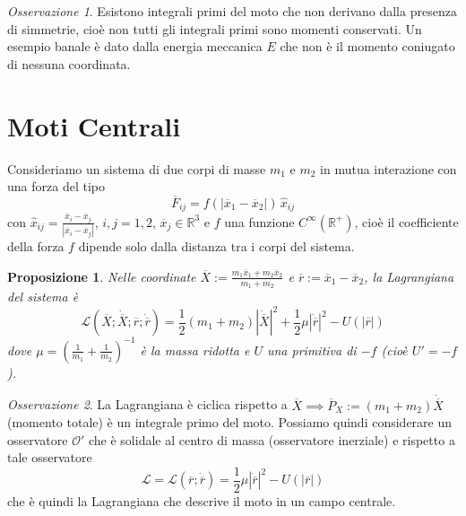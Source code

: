 \documentclass{book}
\theoremstyle{plain}
\theoremstyle{plain}
\theoremstyle{plain}
\theoremstyle{plain}
\theoremstyle{plain}
\newtheorem{prop}{Proposizione}[chapter]
\theoremstyle{definition}
\theoremstyle{remark}
\newtheorem*{oss}{Osservazione}
\theoremstyle{definition}
\begin{document}
\begin{oss}
    Esistono integrali primi del moto che non derivano dalla presenza di simmetrie, cioè non tutti gli integrali primi sono momenti conservati. Un esempio banale è dato dalla energia meccanica $E$ che non è il momento coniugato di nessuna coordinata.
\end{oss}

\section{Moti Centrali}

Consideriamo un sistema di due corpi di masse $m_1$ e $m_2$ in mutua interazione con una forza del tipo
\begin{displaymath}
    \overline{F}_{ij}=f(|\overline{x}_1-\overline{x}_2|)\,\hat{x}_{ij}
\end{displaymath}
con $\hat{x}_{ij}=\frac{\overline{x}_i-\overline{x}_j}{|\overline{x}_i-\overline{x}_j|}$, $i,j=1,2$, $\overline{x}_j\in\mathbb{R}^3$ e $f$ una funzione $C^\infty(\mathbb{R}^+)$, cioè il coefficiente della forza $f$ dipende solo dalla distanza tra i corpi del sistema.

\begin{prop}
\everymath{\displaystyle}
    Nelle coordinate $\overline{X}:=\frac{m_1\overline{x}_1+m_2\overline{x}_2}{m_1+m_2}$ e $\overline{r}:=\overline{x}_1-\overline{x}_2$, la Lagrangiana del sistema è
    \begin{displaymath}
        \mathcal{L}(\overline{X};\dot{\overline{X}};\overline{r};\dot{\overline{r}})=\frac{1}{2}(m_1+m_2)|\dot{\overline{X}}|^2+\frac{1}{2}\mu|\dot{\overline{r}}|^2 -U(|\overline{r}|)
    \end{displaymath}
    dove $\mu=(\frac{1}{m_1}+\frac{1}{m_2})^{-1}$ è la massa ridotta e $U$ una primitiva di $-f$ (cioè $U'=-f$).
\end{prop}

\begin{oss}
    La Lagrangiana è ciclica rispetto a $\overline{X} \implies \overline{P}_X:=(m_1+m_2)\dot{\overline{X}}$ (momento totale) è un integrale primo del moto. Possiamo quindi considerare un osservatore $\mathcal{O}'$ che è solidale al centro di massa (osservatore inerziale) e rispetto a tale osservatore
    \begin{displaymath}
    \boxed{
        \mathcal{L}=\mathcal{L}(\overline{r};\dot{\overline{r}})=\frac{1}{2}\mu|\dot{\overline{r}}|^2 - U(|\overline{r}|)
        }
    \end{displaymath}
    che è quindi la Lagrangiana che descrive il moto in un campo centrale.
\end{oss}
\end{document}
